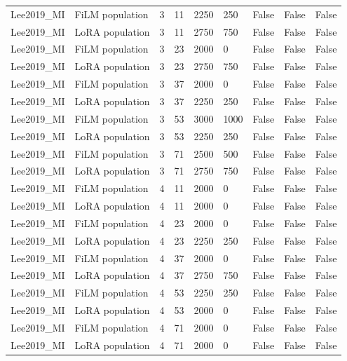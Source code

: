 \begin{longtable}{lllllllll}
Lee2019\_\allowbreak{}MI & FiLM population & 3 & 11 & 2250 & 250 & False & False & False \\
Lee2019\_\allowbreak{}MI & LoRA population & 3 & 11 & 2750 & 750 & False & False & False \\
Lee2019\_\allowbreak{}MI & FiLM population & 3 & 23 & 2000 & 0 & False & False & False \\
Lee2019\_\allowbreak{}MI & LoRA population & 3 & 23 & 2750 & 750 & False & False & False \\
Lee2019\_\allowbreak{}MI & FiLM population & 3 & 37 & 2000 & 0 & False & False & False \\
Lee2019\_\allowbreak{}MI & LoRA population & 3 & 37 & 2250 & 250 & False & False & False \\
Lee2019\_\allowbreak{}MI & FiLM population & 3 & 53 & 3000 & 1000 & False & False & False \\
Lee2019\_\allowbreak{}MI & LoRA population & 3 & 53 & 2250 & 250 & False & False & False \\
Lee2019\_\allowbreak{}MI & FiLM population & 3 & 71 & 2500 & 500 & False & False & False \\
Lee2019\_\allowbreak{}MI & LoRA population & 3 & 71 & 2750 & 750 & False & False & False \\
Lee2019\_\allowbreak{}MI & FiLM population & 4 & 11 & 2000 & 0 & False & False & False \\
Lee2019\_\allowbreak{}MI & LoRA population & 4 & 11 & 2000 & 0 & False & False & False \\
Lee2019\_\allowbreak{}MI & FiLM population & 4 & 23 & 2000 & 0 & False & False & False \\
Lee2019\_\allowbreak{}MI & LoRA population & 4 & 23 & 2250 & 250 & False & False & False \\
Lee2019\_\allowbreak{}MI & FiLM population & 4 & 37 & 2000 & 0 & False & False & False \\
Lee2019\_\allowbreak{}MI & LoRA population & 4 & 37 & 2750 & 750 & False & False & False \\
Lee2019\_\allowbreak{}MI & FiLM population & 4 & 53 & 2250 & 250 & False & False & False \\
Lee2019\_\allowbreak{}MI & LoRA population & 4 & 53 & 2000 & 0 & False & False & False \\
Lee2019\_\allowbreak{}MI & FiLM population & 4 & 71 & 2000 & 0 & False & False & False \\
Lee2019\_\allowbreak{}MI & LoRA population & 4 & 71 & 2000 & 0 & False & False & False \\

\end{longtable}

